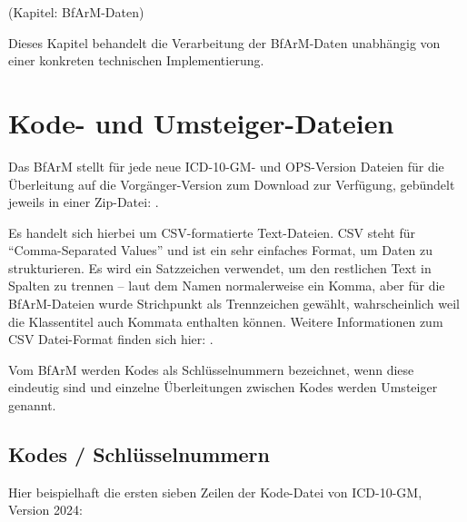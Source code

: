 (Kapitel: BfArM-Daten)

Dieses Kapitel behandelt die Verarbeitung der BfArM-Daten unabhängig von einer konkreten technischen Implementierung. 

\section{Kode- und Umsteiger-Dateien}

Das BfArM stellt für jede neue ICD-10-GM- und OPS-Version Dateien für die Überleitung auf die Vorgänger-Version zum Download zur Verfügung, gebündelt jeweils in einer Zip-Datei: \citep[Downloads]{bfarmdl}.

Es handelt sich hierbei um CSV-formatierte Text-Dateien. CSV steht für "`Comma-Separated Values"' und ist ein sehr einfaches Format, um Daten zu strukturieren. Es wird ein Satzzeichen verwendet, um den restlichen Text in Spalten zu trennen -- laut dem Namen normalerweise ein Komma, aber für die BfArM-Dateien wurde Strichpunkt als Trennzeichen gewählt, wahrscheinlich weil die Klassentitel auch Kommata enthalten können. Weitere Informationen zum CSV Datei-Format finden sich hier: \citep[Seite 131f]{bonnefoy2024definitive}. 

Vom BfArM werden Kodes als Schlüsselnummern bezeichnet, wenn diese eindeutig sind und einzelne Überleitungen zwischen Kodes werden Umsteiger genannt.

\subsection{Kodes / Schlüsselnummern}

Hier beispielhaft die ersten sieben Zeilen der Kode-Datei von ICD-10-GM, Version 2024:


